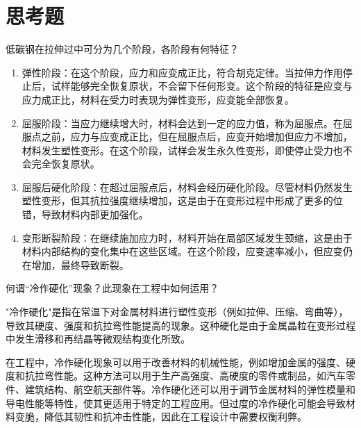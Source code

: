 \section{思考题}
    \item 低碳钢在拉伸过中可分为几个阶段，各阶段有何特征？\par
        \begin{enumerate}
            \item 弹性阶段：在这个阶段，应力和应变成正比，符合胡克定律。当拉伸力作用停止后，试样能够完全恢复原状，不会留下任何形变。这个阶段的特征是应变与应力成正比，材料在受力时表现为弹性变形，应变能全部恢复。
            \item 屈服阶段：当应力继续增大时，材料会达到一定的应力值，称为屈服点。在屈服点之前，应力与应变成正比，但在屈服点后，应变开始增加但应力不增加，材料发生塑性变形。在这个阶段，试样会发生永久性变形，即使停止受力也不会完全恢复原状。
            \item 屈服后硬化阶段：在超过屈服点后，材料会经历硬化阶段。尽管材料仍然发生塑性变形，但其抗拉强度继续增加，这是由于在变形过程中形成了更多的位错，导致材料内部更加强化。
            \item 变形断裂阶段：在继续施加应力时，材料开始在局部区域发生颈缩，这是由于材料内部结构的变化集中在这些区域。在这个阶段，应变速率减小，但应变仍在增加，最终导致断裂。
        \end{enumerate}
    \item 何谓“冷作硬化”现象？此现象在工程中如何运用？\par
    "冷作硬化"是指在常温下对金属材料进行塑性变形（例如拉伸、压缩、弯曲等），导致其硬度、强度和抗拉弯性能提高的现象。这种硬化是由于金属晶粒在变形过程中发生滑移和再结晶等微观结构变化所致。\par
    在工程中，冷作硬化现象可以用于改善材料的机械性能，例如增加金属的强度、硬度和抗拉弯性能。这种方法可以用于生产高强度、高硬度的零件或制品，如汽车零件、建筑结构、航空航天部件等。冷作硬化还可以用于调节金属材料的弹性模量和导电性能等特性，使其更适用于特定的工程应用。但过度的冷作硬化可能会导致材料变脆，降低其韧性和抗冲击性能，因此在工程设计中需要权衡利弊。
